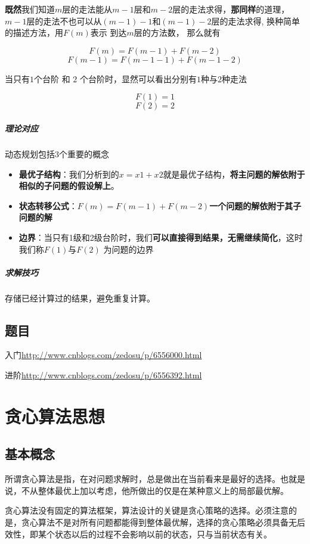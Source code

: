 \documentclass[UTF8,a4paper,12pt]{ctexbook}
\begin{document}
					\textbf{既然}我们知道$m$层的走法能从$m - 1$层和$m-2$层的走法求得，\textbf{那同样}的道理，$m-1$层的走法不也可以从$(m-1) - 1$和$(m-1)-2$层的走法求得, 换种简单的描述方法，用$F(m)$表示 到达$m$层的方法数， 那么就有
					
					$$F(m) = F(m-1) + F(m-2)$$
					$$F(m-1) = F(m-1-1) + F(m-1-2)$$
					
					当只有$1$个台阶 和 $2$ 个台阶时，显然可以看出分别有$1$种与$2$种走法
					
					$$F(1) = 1$$
					$$F(2) = 2$$
					
				\subparagraph{理论对应}
					动态规划包括3个重要的概念
						\begin{itemize}
							\item \textbf{最优子结构}：我们分析到的$x = x1 + x2$就是最优子结构，\textbf{将主问题的解依附于相似的子问题的假设解上}。
							
							\item \textbf{状态转移公式}：$F(m) = F(m-1) + F(m-2)$\textbf{一个问题的解依附于其子问题的解}
							
							\item \textbf{边界}：当只有1级和2级台阶时，我们\textbf{可以直接得到结果，无需继续简化}，这时我们称$F(1)$与$F(2)$ 为问题的边界
						\end{itemize}
						
				\subparagraph{求解技巧}
						存储已经计算过的结果，避免重复计算。
		
		\subsection{题目}
			入门\url{http://www.cnblogs.com/zedosu/p/6556000.html}
			
			进阶\url{http://www.cnblogs.com/zedosu/p/6556392.html}
				
	\section{贪心算法思想}
		\subsection{基本概念}
			所谓贪心算法是指，在对问题求解时，总是做出在当前看来是最好的选择。也就是说，不从整体最优上加以考虑，他所做出的仅是在某种意义上的局部最优解。
			
			贪心算法没有固定的算法框架，算法设计的关键是贪心策略的选择。必须注意的是，贪心算法不是对所有问题都能得到整体最优解，选择的贪心策略必须具备无后效性，即某个状态以后的过程不会影响以前的状态，只与当前状态有关。
			
\end{document}
